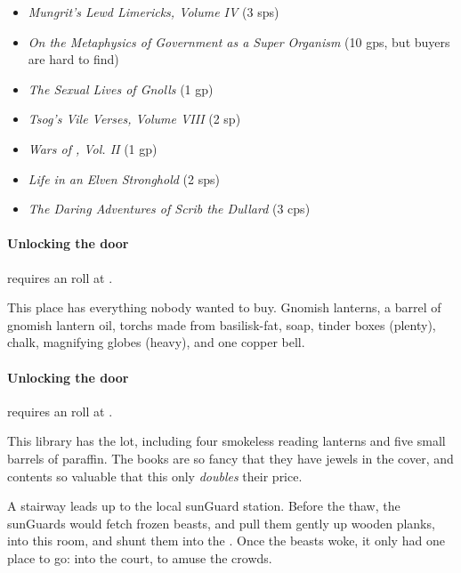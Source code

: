 \begin{multicols}{2}
\begin{itemize}
  \item
  \textit{Mungrit's Lewd Limericks, Volume IV} (3 \glspl{sp})
  \item
  \textit{On the Metaphysics of Government as a Super Organism} (10 \glspl{gp}, but buyers are hard to find)
  \item
  \textit{The Sexual Lives of Gnolls} (1 \gls{gp})
  \item
  \textit{Tsog's Vile Verses, Volume VIII} (2 sp)
  \item
  \textit{Wars of , Vol. II} (1 \gls{gp})
  \item
  \textit{Life in an Elven Stronghold} (2 \glspl{sp})
  \item
  \textit{The Daring Adventures of Scrib the Dullard} (3 \glspl{cp})
\end{itemize}

\paragraph{Unlocking the door}
requires an  roll at \tn[13].


This place has everything nobody wanted to buy.
Gnomish lanterns, a barrel of gnomish lantern oil, \glspl{torch} made from \gls{basilisk}-fat, soap, tinder boxes (plenty), chalk, magnifying globes (heavy), and one copper bell.

\paragraph{Unlocking the door}
requires an  roll at \tn[13].


This library has the lot, including four smokeless reading lanterns and five small barrels of paraffin.
The books are so fancy that they have jewels in the cover, and contents so valuable that this only \emph{doubles} their price.




\begin{exampletext}
  A stairway leads up to the local \gls{sunGuard} station.
  Before the thaw, the \glspl{sunGuard} would fetch frozen beasts, and pull them gently up wooden planks, into this room, and shunt them into the .
  Once the beasts woke, it only had one place to go: into the \gls{court}, to amuse the crowds.
\end{exampletext}


\end{multicols}

